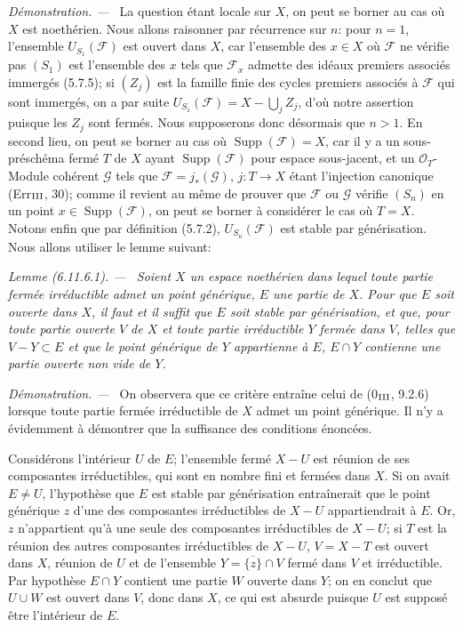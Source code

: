 \documentclass[10pt,oneside]{book}
\newenvironment{lemma}[1][]{%
  \par\medskip\noindent\itshape Lemme (#1). ---\ }{\par}
\newenvironment{proof}{%
  \par\medskip\noindent\textit{Démonstration. ---\ }}{\par}
\begin{document}
\begin{proof}
La question étant locale sur $X$, on peut se borner au cas où $X$ est
noethérien. Nous allons raisonner par récurrence sur $n$: pour $n=1$,
l'ensemble $U_{S_1}(\mathcal F)$ est ouvert dans $X$, car l'ensemble des
$x\in X$ où $\mathcal F$ ne vérifie pas $(S_1)$ est l'ensemble des $x$ tels
que $\mathcal F_x$ admette des idéaux premiers associés immergés (5.7.5);
si $(Z_j)$ est la famille finie des cycles premiers associés à $\mathcal F$
qui sont immergés, on a par suite
$U_{S_1}(\mathcal F)=X-\bigcup_jZ_j$, d'où notre assertion puisque les
$Z_j$ sont fermés. Nous supposerons donc désormais que $n>1$. En second
lieu, on peut se borner au cas où
$\operatorname{Supp}(\mathcal F)=X$, car il y a un sous-préschéma fermé
$T$ de $X$ ayant $\operatorname{Supp}(\mathcal F)$ pour espace sous-jacent,
et un $\mathcal O_T$-Module cohérent $\mathcal G$ tels que
$\mathcal F=j_*(\mathcal G)$, $j:T\to X$ étant l'injection canonique
(Err$_{\rm III}$, 30); comme il revient au même de prouver que $\mathcal F$
ou $\mathcal G$ vérifie $(S_n)$ en un point
$x\in\operatorname{Supp}(\mathcal F)$, on peut se borner à considérer le
cas où $T=X$. Notons enfin que par définition (5.7.2),
$U_{S_n}(\mathcal F)$ est stable par générisation. Nous allons utiliser le
lemme suivant:

\begin{lemma}[6.11.6.1]
\label{IV.2.s6.11.6.1-fr}
Soient $X$ un espace noethérien dans lequel toute partie fermée irréductible
admet un point générique, $E$ une partie de $X$. Pour que $E$ soit ouverte
dans $X$, il faut et il suffit que $E$ soit stable par générisation, et que,
pour toute partie ouverte $V$ de $X$ et toute partie irréductible $Y$ fermée
dans $V$, telles que $V-Y\subset E$ et que le point générique de $Y$
appartienne à $E$, $E\cap Y$ contienne une partie ouverte non vide de $Y$.
\end{lemma}

\begin{proof}
On observera que ce critère entraîne celui de (0$_{\rm III}$, 9.2.6)
lorsque toute partie fermée irréductible de $X$ admet un point générique.
Il n'y a évidemment à démontrer que la suffisance des conditions énoncées.

Considérons l'intérieur $U$ de $E$; l'ensemble fermé $X-U$ est réunion de
ses composantes irréductibles, qui sont en nombre fini et fermées dans $X$.
Si on avait $E\ne U$, l'hypothèse que $E$ est stable par générisation
entraînerait que le point générique $z$ d'une des composantes irréductibles
de $X-U$ appartiendrait à $E$. Or, $z$ n'appartient qu'à une seule des
composantes irréductibles de $X-U$; si $T$ est la réunion des autres
composantes irréductibles de $X-U$, $V=X-T$ est ouvert dans $X$, réunion de
$U$ et de l'ensemble $Y=\overline{\{z\}}\cap V$ fermé dans $V$ et
irréductible. Par hypothèse $E\cap Y$ contient une partie $W$ ouverte dans
$Y$; on en conclut que $U\cup W$ est ouvert dans $V$, donc dans $X$, ce qui
est absurde puisque $U$ est supposé être l'intérieur de $E$.
\end{proof}


\end{proof}
\end{document}
